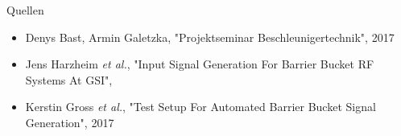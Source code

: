 \begin{frame}{Quellen}

\begin{itemize}
	\item Denys Bast, Armin Galetzka, "Projektseminar Beschleunigertechnik", 2017
	\item Jens Harzheim \textit{et al.}, "Input Signal Generation For Barrier Bucket RF Systems At GSI", 
	\item Kerstin Gross \textit{et al.}, "Test Setup For Automated Barrier Bucket Signal Generation", 2017
\end{itemize}



\end{frame}



